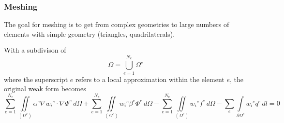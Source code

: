 \subsubsection{Meshing}
The goal for meshing is to get from complex geometries to large numbers of elements with simple geometry (triangles, quadrilaterals).\newline

With a subdivison of
\begin{equation*}
	\Omega = \bigcup\limits_{e=1}^{N_e} \Omega^e
\end{equation*}
where the superscript $e$ refers to a local approximation within the element $e$, the original weak form becomes
\begin{equation*}
	\sum_{e=1}^{N_e} \iint\limits_{\left(\Omega^e\right)} \alpha^e \nabla {w_i}^e \cdot \nabla \Phi^e\,d\Omega + \sum_{e=1}^{N_e} \iint\limits_{\left(\Omega^e\right)} {w_i}^e\beta^e\Phi^e\,d\Omega - \sum_{e=1}^{N_e} \iint\limits_{\left(\Omega^e\right)}{w_i}^e f^e\,d\Omega  - \sum_{e} \int\limits_{\partial \Omega^e} {w_i}^e q^e\,dl = 0
\end{equation*} 

